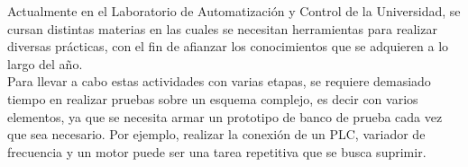 Actualmente en el Laboratorio de Automatización y Control de la Universidad, se cursan distintas materias en las cuales se necesitan herramientas para realizar diversas prácticas, con el fin de afianzar los conocimientos que se adquieren a lo largo del año.
\\

Para llevar a cabo estas actividades con varias etapas, se requiere demasiado tiempo en realizar pruebas sobre un esquema complejo, es decir con varios elementos, ya que se necesita armar un prototipo de banco de prueba cada vez que sea necesario. Por ejemplo, realizar la conexión de un PLC, variador de frecuencia y un motor puede ser una tarea repetitiva que se busca suprimir. 

\newpage